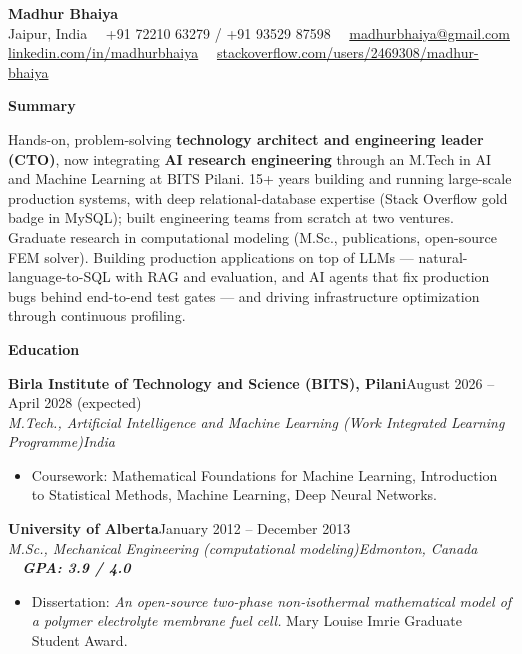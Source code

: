 \documentclass[a4paper,10pt]{article}
\newcommand{\resheading}[1]{%
  \par\vspace{10pt}%
  \noindent\colorbox{headbg}{\parbox{\dimexpr\linewidth-2\fboxsep\relax}{%
    \strut\color{accent}\large\bfseries #1}}\par%
  \vspace{5pt}%
}
\newcommand{\resrole}[4]{%
  {\color{accent}\bfseries #1}\hfill{\color{muted}#2}\\%
  {\itshape #3}\hfill{\color{muted}\itshape #4}\par\vspace{1pt}%
}
\newcommand{\resgap}{\vspace{6pt}}
\begin{document}
\color{body}

\begin{center}
{\fontsize{22}{26}\selectfont\bfseries\color{accent}Madhur Bhaiya}\\[5pt]
{\color{muted}Jaipur, India \ \textbar\ +91 72210 63279 / +91 93529 87598 \ \textbar\ \href{mailto:madhurbhaiya@gmail.com}{madhurbhaiya@gmail.com}}\\[1pt]
{\color{muted}\href{https://linkedin.com/in/madhurbhaiya}{linkedin.com/in/madhurbhaiya} \ \textbar\ \href{https://stackoverflow.com/users/2469308/madhur-bhaiya}{stackoverflow.com/users/2469308/madhur-bhaiya}}
\end{center}
\vspace{-6pt}

\resheading{Summary}

Hands-on, problem-solving \textbf{technology architect and engineering leader (CTO)}, now integrating \textbf{AI research engineering} through an M.Tech in AI and Machine Learning at BITS Pilani. 15+ years building and running large-scale production systems, with deep relational-database expertise (Stack Overflow gold badge in MySQL); built engineering teams from scratch at two ventures. Graduate research in computational modeling (M.Sc., publications, open-source FEM solver). Building production applications on top of LLMs --- natural-language-to-SQL with RAG and evaluation, and AI agents that fix production bugs behind end-to-end test gates --- and driving infrastructure optimization through continuous profiling.

\resheading{Education}

\resrole{Birla Institute of Technology and Science (BITS), Pilani}{August 2026 -- April 2028 (expected)}{M.Tech., Artificial Intelligence and Machine Learning (Work Integrated Learning Programme)}{India}
\begin{itemize}
  \item Coursework: Mathematical Foundations for Machine Learning, Introduction to Statistical Methods, Machine Learning, Deep Neural Networks.
\end{itemize}
\resgap

\resrole{University of Alberta}{January 2012 -- December 2013}{M.Sc., Mechanical Engineering (computational modeling)}{Edmonton, Canada \ \textbar\ {\upshape\bfseries\color{body}GPA: 3.9 / 4.0}}
\begin{itemize}
  \item Dissertation: \textit{An open-source two-phase non-isothermal mathematical model of a polymer electrolyte membrane fuel cell.} Mary Louise Imrie Graduate Student Award.
\end{itemize}
\resgap
\end{document}
